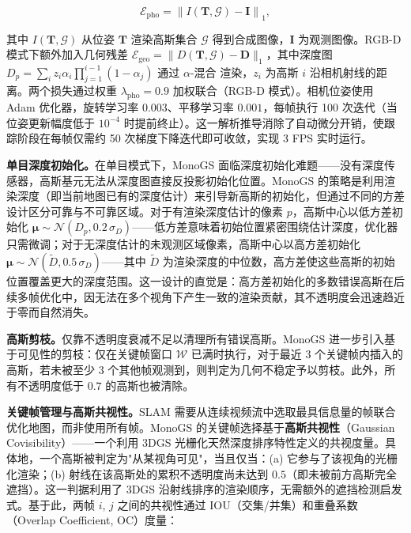 \begin{equation*}
\mathcal{E}_{\mathrm{pho}} = \left\| I(\mathbf{T}, \mathcal{G}) - \mathbf{I} \right\|_1,
\end{equation*}

其中 $I(\mathbf{T}, \mathcal{G})$ 从位姿 $\mathbf{T}$ 渲染高斯集合 $\mathcal{G}$ 得到合成图像，$\mathbf{I}$ 为观测图像。RGB-D 模式下额外加入几何残差 $\mathcal{E}_{\mathrm{geo}} = \| D(\mathbf{T}, \mathcal{G}) - \mathbf{D} \|_1$，其中深度图 $D_p = \sum_i z_i \alpha_i \prod_{j=1}^{i-1}(1 - \alpha_j)$ 通过 $\alpha$-混合 渲染，$z_i$ 为高斯 $i$ 沿相机射线的距离。两个损失通过权重 $\lambda_{\mathrm{pho}} = 0.9$ 加权联合（RGB-D 模式）。相机位姿使用 Adam 优化器，旋转学习率 $0.003$、平移学习率 $0.001$，每帧执行 100 次迭代（当位姿更新幅度低于 $10^{-4}$ 时提前终止）。这一解析推导消除了自动微分开销，使跟踪阶段在每帧仅需约 50 次梯度下降迭代即可收敛，实现 3 FPS 实时运行。

\textbf{单目深度初始化。}在单目模式下，MonoGS 面临深度初始化难题——没有深度传感器，高斯基元无法从深度图直接反投影初始化位置。MonoGS 的策略是利用渲染深度（即当前地图已有的深度估计）来引导新高斯的初始化，但通过不同的方差设计区分可靠与不可靠区域。对于有渲染深度估计的像素 $p$，高斯中心以低方差初始化 $\boldsymbol{\mu} \sim \mathcal{N}(D_p, 0.2\,\sigma_D)$——低方差意味着初始位置紧密围绕估计深度，优化器只需微调；对于无深度估计的未观测区域像素，高斯中心以高方差初始化 $\boldsymbol{\mu} \sim \mathcal{N}(\tilde{D}, 0.5\,\sigma_D)$——其中 $\tilde{D}$ 为渲染深度的中位数，高方差使这些高斯的初始位置覆盖更大的深度范围。这一设计的直觉是：高方差初始化的多数错误高斯在后续多帧优化中，因无法在多个视角下产生一致的渲染贡献，其不透明度会迅速趋近于零而自然消失。

\textbf{高斯剪枝。}仅靠不透明度衰减不足以清理所有错误高斯。MonoGS 进一步引入基于可见性的剪枝：仅在关键帧窗口 $\mathcal{W}$ 已满时执行，对于最近 3 个关键帧内插入的高斯，若未被至少 3 个其他帧观测到，则判定为几何不稳定予以剪枝。此外，所有不透明度低于 $0.7$ 的高斯也被清除。

\textbf{关键帧管理与高斯共视性。}SLAM 需要从连续视频流中选取最具信息量的帧联合优化地图，而非使用所有帧。MonoGS 的关键帧选择基于\textbf{高斯共视性}（Gaussian Covisibility）——一个利用 3DGS 光栅化天然深度排序特性定义的共视度量。具体地，一个高斯被判定为"从某视角可见"，当且仅当：(a) 它参与了该视角的光栅化渲染；(b) 射线在该高斯处的累积不透明度尚未达到 $0.5$（即未被前方高斯完全遮挡）。这一判据利用了 3DGS 沿射线排序的渲染顺序，无需额外的遮挡检测启发式。基于此，两帧 $i$, $j$ 之间的共视性通过 IOU（交集/并集）和重叠系数（Overlap Coefficient, OC）度量：

